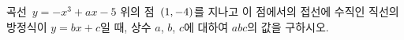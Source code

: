 곡선~$y=-x^3+ax-5$ 위의 점~$(1{,}\mkern3mu\mathopen{}-4)$를 지나고 이 점에서의 접선에 수직인 직선의 방정식이 $y=bx+c$일 때, 상수 $a$, $b$, $c$에 대하여 $abc$의 값을 구하시오.
